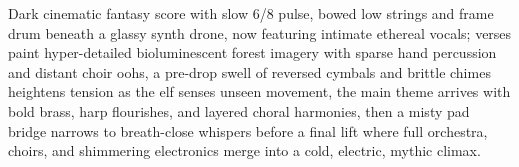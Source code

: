 
\begin{notes}
\end{notes}

\begin{style}
Dark cinematic fantasy score with slow 6/8 pulse, bowed low strings and frame drum beneath a glassy synth drone, now featuring intimate ethereal vocals; verses paint hyper-detailed bioluminescent forest imagery with sparse hand percussion and distant choir oohs, a pre-drop swell of reversed cymbals and brittle chimes heightens tension as the elf senses unseen movement, the main theme arrives with bold brass, harp flourishes, and layered choral harmonies, then a misty pad bridge narrows to breath-close whispers before a final lift where full orchestra, choirs, and shimmering electronics merge into a cold, electric, mythic climax.
\end{style}

